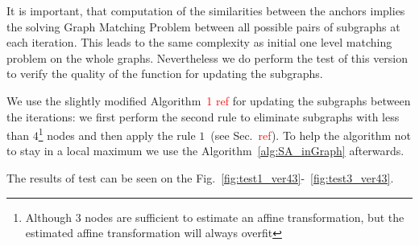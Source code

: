 \documentclass[
	fontsize=12pt,
	paper=a4,
	twoside=false,
	numbers=noenddot,
	plainheadsepline,
	toc=listof,
	toc=bibliography
]{scrartcl}
\newcommand\ToDo[1]{\textcolor{red}{#1}}
\begin{document}
It is important, that computation of the similarities between the anchors implies the solving Graph Matching Problem between all possible pairs of subgraphs at each iteration. This leads to the same complexity as initial one level matching problem on the whole graphs. Nevertheless we do perform the test of this version to verify the quality of the function for updating the subgraphs.

We use the slightly modified Algorithm~\ToDo{1 ref} for updating the subgraphs between the iterations: we first perform the second rule to eliminate subgraphs with less than $4$\footnote{Although $3$ nodes are sufficient to estimate an affine transformation, but the estimated affine transformation will always overfit} nodes and then apply the rule $1$~(see Sec.~\ToDo{ref}). To help the algorithm not to stay in a local maximum we use the Algorithm~\ref{alg:SA_inGraph} afterwards.

The results of test can be seen on the Fig.~\ref{fig:test1_ver43}-~\ref{fig:test3_ver43}.
\end{document}
